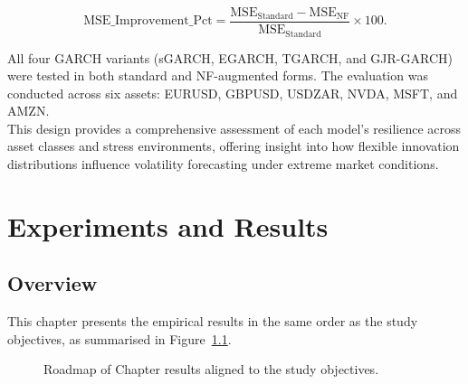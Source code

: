 \documentclass[oneside,12pt]{CUEDthesisPSnPDF}
\begin{document}
\medskip
\[
\text{MSE\_Improvement\_Pct} = \frac{\text{MSE}_{\text{Standard}} - \text{MSE}_{\text{NF}}}{\text{MSE}_{\text{Standard}}} \times 100.
\]
\vspace{8pt}

All four GARCH variants (sGARCH, EGARCH, TGARCH, and GJR-GARCH) were tested in both standard and NF-augmented forms. The evaluation was conducted across six assets: EURUSD, GBPUSD, USDZAR, NVDA, MSFT, and AMZN.\\

This design provides a comprehensive assessment of each model’s resilience across asset classes and stress environments, offering insight into how flexible innovation distributions influence volatility forecasting under extreme market conditions.\\


\chapter{Experiments and Results}
\label{ch:results} 

\section{Overview}
\noindent
This chapter presents the empirical results in the same order as the study objectives, as summarised in Figure~\ref{fig:results_roadmap}.

\begin{figure}[H]
\centering
{}
\caption{Roadmap of Chapter results aligned to the study objectives.}
\label{fig:results_roadmap}
\end{figure}
\end{document}
